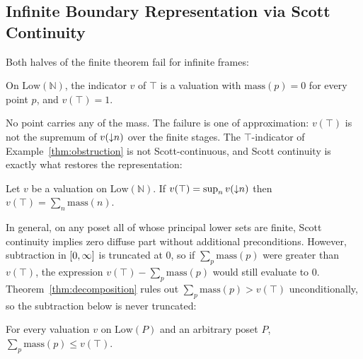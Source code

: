 \subsection{Infinite Boundary Representation via Scott Continuity}

Both halves of the finite theorem fail for infinite frames:

\begin{example}
\label{thm:obstruction}
On $\mathrm{Low}(\mathbb{N})$, the indicator $v$ of $\top$ is a
valuation with $\mathrm{mass}(p) = 0$ for every point $p$, and
$v(\top) = 1$.
\end{example}

\noindent
No point carries any of the mass.  The failure is one of
approximation: $v(\top)$ is not the supremum of $v({\downarrow} n)$
over the finite stages. The $\top$-indicator of Example~\ref{thm:obstruction} is not
Scott-continuous, and Scott
continuity is exactly what restores the representation:

\begin{example}
\label{thm:recovery}
Let $v$ be a valuation on $\mathrm{Low}(\mathbb{N})$. If
$v(\top) = \sup_n v({\downarrow} n)$
then $v(\top) = \sum_n \mathrm{mass}(n)$.
\end{example}

In general, on
any poset all of whose principal lower sets are finite, Scott
continuity implies zero diffuse part without additional preconditions.
However, subtraction in $[0,\infty]$ is truncated at $0$, so if
$\sum_p \mathrm{mass}(p)$ were greater than $v(\top)$, the expression
$v(\top) - \sum_p \mathrm{mass}(p)$ would still evaluate to $0$.
Theorem~\ref{thm:decomposition} rules out
$\sum_p \mathrm{mass}(p) > v(\top)$ unconditionally, so the
subtraction below is never truncated:

\begin{theorem}
\label{thm:decomposition}
For every valuation $v$ on $\mathrm{Low}(P)$ and an arbitrary poset $P$,
$\sum_p \mathrm{mass}(p) \le v(\top)$.
\end{theorem}

